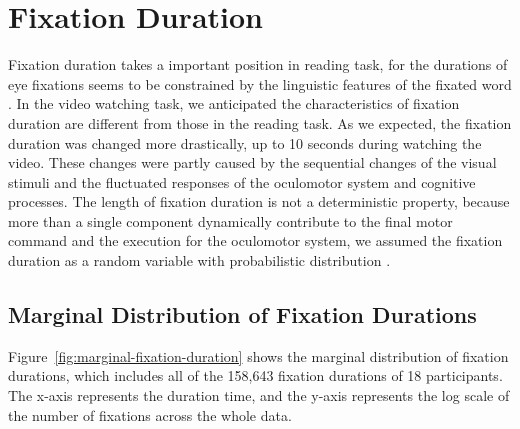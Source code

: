 \documentclass[oneside,master]{snueethesis}
\begin{document}
\chapter{Fixation Duration}
\label{sec:fixation-duration}

Fixation duration takes a important position in reading task, for the durations of eye fixations seems to be constrained by the linguistic features of the fixated word \cite{Rayner1986,Inhoff1986}. In the video watching task, we anticipated the characteristics of fixation duration are different from those in the reading task. As we expected, the fixation duration was changed more drastically, up to 10 seconds during watching the video. These changes were partly caused by the sequential changes of the visual stimuli and the fluctuated responses of the oculomotor system and cognitive processes. The length of fixation duration is not a deterministic property, because more than a single component dynamically contribute to the final motor command and the execution for the oculomotor system, we assumed the fixation duration as a random variable with probabilistic distribution \cite{Rayner1998,Reichle2004,Reichle2006}.


\section{Marginal Distribution of Fixation Durations}

Figure~\ref{fig:marginal-fixation-duration} shows the marginal distribution of fixation durations, which includes all of the 158,643 fixation durations of 18 participants. The x-axis represents the duration time, and the y-axis represents the log scale of the number of fixations across the whole data.
\end{document}
